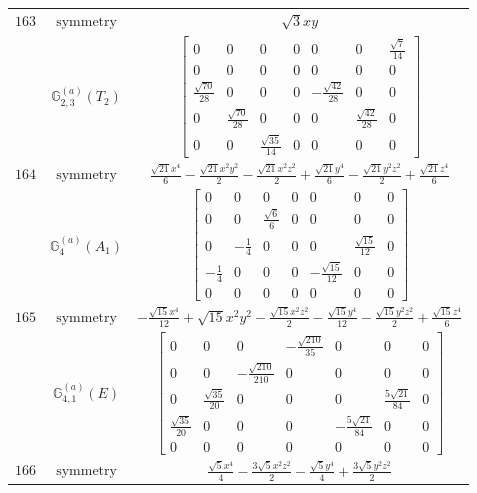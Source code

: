 \documentclass[fleqn,8pt,landscape]{jsarticle}
\begin{document}
\begin{longtable}{ccc}
$ 163 $ & $ \text{symmetry} $ & $ \sqrt{3} x y $ \\
$  $ & $ \mathbb{G}_{2,3}^{(a)}(T_{2}) $ & $ \begin{bmatrix} 0 & 0 & 0 & 0 & 0 & 0 & \frac{\sqrt{7}}{14} \\ 0 & 0 & 0 & 0 & 0 & 0 & 0 \\ \frac{\sqrt{70}}{28} & 0 & 0 & 0 & - \frac{\sqrt{42}}{28} & 0 & 0 \\ 0 & \frac{\sqrt{70}}{28} & 0 & 0 & 0 & \frac{\sqrt{42}}{28} & 0 \\ 0 & 0 & \frac{\sqrt{35}}{14} & 0 & 0 & 0 & 0 \end{bmatrix} $ \\ \hline
$ 164 $ & $ \text{symmetry} $ & $ \frac{\sqrt{21} x^{4}}{6} - \frac{\sqrt{21} x^{2} y^{2}}{2} - \frac{\sqrt{21} x^{2} z^{2}}{2} + \frac{\sqrt{21} y^{4}}{6} - \frac{\sqrt{21} y^{2} z^{2}}{2} + \frac{\sqrt{21} z^{4}}{6} $ \\
$  $ & $ \mathbb{G}_{4}^{(a)}(A_{1}) $ & $ \begin{bmatrix} 0 & 0 & 0 & 0 & 0 & 0 & 0 \\ 0 & 0 & \frac{\sqrt{6}}{6} & 0 & 0 & 0 & 0 \\ 0 & - \frac{1}{4} & 0 & 0 & 0 & \frac{\sqrt{15}}{12} & 0 \\ - \frac{1}{4} & 0 & 0 & 0 & - \frac{\sqrt{15}}{12} & 0 & 0 \\ 0 & 0 & 0 & 0 & 0 & 0 & 0 \end{bmatrix} $ \\ \hline
$ 165 $ & $ \text{symmetry} $ & $ - \frac{\sqrt{15} x^{4}}{12} + \sqrt{15} x^{2} y^{2} - \frac{\sqrt{15} x^{2} z^{2}}{2} - \frac{\sqrt{15} y^{4}}{12} - \frac{\sqrt{15} y^{2} z^{2}}{2} + \frac{\sqrt{15} z^{4}}{6} $ \\
$  $ & $ \mathbb{G}_{4,1}^{(a)}(E) $ & $ \begin{bmatrix} 0 & 0 & 0 & - \frac{\sqrt{210}}{35} & 0 & 0 & 0 \\ 0 & 0 & - \frac{\sqrt{210}}{210} & 0 & 0 & 0 & 0 \\ 0 & \frac{\sqrt{35}}{20} & 0 & 0 & 0 & \frac{5 \sqrt{21}}{84} & 0 \\ \frac{\sqrt{35}}{20} & 0 & 0 & 0 & - \frac{5 \sqrt{21}}{84} & 0 & 0 \\ 0 & 0 & 0 & 0 & 0 & 0 & 0 \end{bmatrix} $ \\ \hline
$ 166 $ & $ \text{symmetry} $ & $ \frac{\sqrt{5} x^{4}}{4} - \frac{3 \sqrt{5} x^{2} z^{2}}{2} - \frac{\sqrt{5} y^{4}}{4} + \frac{3 \sqrt{5} y^{2} z^{2}}{2} $ \\

\end{longtable}
\end{document}
